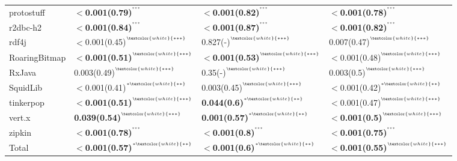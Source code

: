 \begin{tabular}{llll}
protostuff          &  \textbf{$<$0.001(0.79)}\tiny{$^{^{***}}$} &  \textbf{$<$0.001(0.82)}\tiny{$^{^{***}}$} &  \textbf{$<$0.001(0.78)}\tiny{$^{^{***}}$} \\
r2dbc-h2            &  \textbf{$<$0.001(0.84)}\tiny{$^{^{***}}$} &  \textbf{$<$0.001(0.87)}\tiny{$^{^{***}}$} &  \textbf{$<$0.001(0.82)}\tiny{$^{^{***}}$} \\
rdf4j               &  $<$0.001(0.45)\tiny{$^{^{\textcolor{white}{***}}}$} &  0.827(-)\tiny{$^{^{\textcolor{white}{***}}}$} &  0.007(0.47)\tiny{$^{^{\textcolor{white}{***}}}$} \\
RoaringBitmap       &  \textbf{$<$0.001(0.51)}\tiny{$^{^{\textcolor{white}{***}}}$} &  \textbf{$<$0.001(0.53)}\tiny{$^{^{\textcolor{white}{***}}}$} &  $<$0.001(0.48)\tiny{$^{^{\textcolor{white}{***}}}$} \\
RxJava              &  0.003(0.49)\tiny{$^{^{\textcolor{white}{***}}}$} &  0.35(-)\tiny{$^{^{\textcolor{white}{***}}}$} &  0.003(0.5)\tiny{$^{^{\textcolor{white}{***}}}$} \\
SquidLib            &  $<$0.001(0.41)\tiny{$^{^{*\textcolor{white}{**}}}$} &  0.003(0.45)\tiny{$^{^{\textcolor{white}{***}}}$} &  $<$0.001(0.42)\tiny{$^{^{*\textcolor{white}{**}}}$} \\
tinkerpop           &  \textbf{$<$0.001(0.51)}\tiny{$^{^{\textcolor{white}{***}}}$} &  \textbf{0.044(0.6)}\tiny{$^{^{*\textcolor{white}{**}}}$} &  $<$0.001(0.47)\tiny{$^{^{\textcolor{white}{***}}}$} \\
vert.x              &  \textbf{0.039(0.54)}\tiny{$^{^{\textcolor{white}{***}}}$} &  \textbf{0.001(0.57)}\tiny{$^{^{*\textcolor{white}{**}}}$} &  \textbf{$<$0.001(0.5)}\tiny{$^{^{\textcolor{white}{***}}}$} \\
zipkin              &  \textbf{$<$0.001(0.78)}\tiny{$^{^{***}}$} &  \textbf{$<$0.001(0.8)}\tiny{$^{^{***}}$} &  \textbf{$<$0.001(0.75)}\tiny{$^{^{***}}$} \\
Total               &  \textbf{$<$0.001(0.57)}\tiny{$^{^{*\textcolor{white}{**}}}$} &  \textbf{$<$0.001(0.6)}\tiny{$^{^{*\textcolor{white}{**}}}$} &  \textbf{$<$0.001(0.55)}\tiny{$^{^{\textcolor{white}{***}}}$} \\
\bottomrule
\end{tabular}
